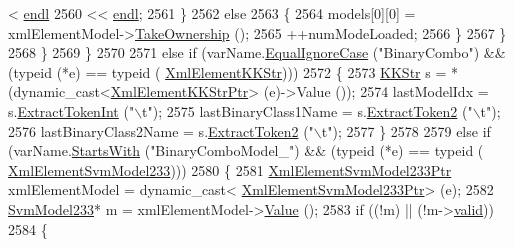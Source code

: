\begin{DoxyCode}
      < \hyperlink{namespace_k_k_b_ad1f50f65af6adc8fa9e6f62d007818a8}{endl}
2560                 << \hyperlink{namespace_k_k_b_ad1f50f65af6adc8fa9e6f62d007818a8}{endl};
2561             \}
2562             \textcolor{keywordflow}{else}
2563             \{
2564               models[0][0] = xmlElementModel->\hyperlink{class_k_k_b_1_1_xml_element_template_a1fd0ce7b0d0ee0d57fb29ca09d3ad6fc}{TakeOwnership} ();
2565               ++numModeLoaded;
2566             \}
2567           \}
2568         \}
2569       \}
2570 
2571       \textcolor{keywordflow}{else} \textcolor{keywordflow}{if}  (varName.\hyperlink{class_k_k_b_1_1_k_k_str_a562f9696417c53f66bc4088eac072ab5}{EqualIgnoreCase} (\textcolor{stringliteral}{"BinaryCombo"})  &&  (\textcolor{keyword}{typeid} (*e) == \textcolor{keyword}{typeid} (
      \hyperlink{class_k_k_b_1_1_xml_element_k_k_str}{XmlElementKKStr})))
2572       \{
2573         \hyperlink{class_k_k_b_1_1_k_k_str}{KKStr} s = *(\textcolor{keyword}{dynamic\_cast<}\hyperlink{class_k_k_b_1_1_xml_element_k_k_str}{XmlElementKKStrPtr}\textcolor{keyword}{>} (e)->Value ());
2574         lastModelIdx = s.\hyperlink{class_k_k_b_1_1_k_k_str_ae50047144b908273ffd004bd9379f6d0}{ExtractTokenInt} (\textcolor{stringliteral}{"\(\backslash\)t"});
2575         lastBinaryClass1Name = s.\hyperlink{class_k_k_b_1_1_k_k_str_afe41140cee0520f0be8a3022938a1b03}{ExtractToken2} (\textcolor{stringliteral}{"\(\backslash\)t"});
2576         lastBinaryClass2Name = s.\hyperlink{class_k_k_b_1_1_k_k_str_afe41140cee0520f0be8a3022938a1b03}{ExtractToken2} (\textcolor{stringliteral}{"\(\backslash\)t"});
2577       \}
2578 
2579       \textcolor{keywordflow}{else} \textcolor{keywordflow}{if}  (varName.\hyperlink{class_k_k_b_1_1_k_k_str_a7026d727e15a0e9300b6ba68252accb0}{StartsWith} (\textcolor{stringliteral}{"BinaryComboModel\_"})  &&  (\textcolor{keyword}{typeid} (*e) == \textcolor{keyword}{typeid} (
      \hyperlink{namespace_s_v_m233_ac980a127b814b032d64ad46c43530ac0}{XmlElementSvmModel233})))
2580       \{
2581         \hyperlink{class_k_k_b_1_1_xml_element_template}{XmlElementSvmModel233Ptr} xmlElementModel = \textcolor{keyword}{dynamic\_cast<}
      \hyperlink{class_k_k_b_1_1_xml_element_template}{XmlElementSvmModel233Ptr}\textcolor{keyword}{>} (e);
2582         \hyperlink{struct_s_v_m233_1_1_svm_model233}{SvmModel233}* m = xmlElementModel->\hyperlink{class_k_k_b_1_1_xml_element_template_a3d671b57251b4b256fecb2197fc4a0f4}{Value} ();
2583         \textcolor{keywordflow}{if}  ((!m)  ||  (!m->\hyperlink{struct_s_v_m233_1_1_svm_model233_a875589b5c20a1d5a3b2d21d88706abc0}{valid}))
2584         \{

\end{DoxyCode}
